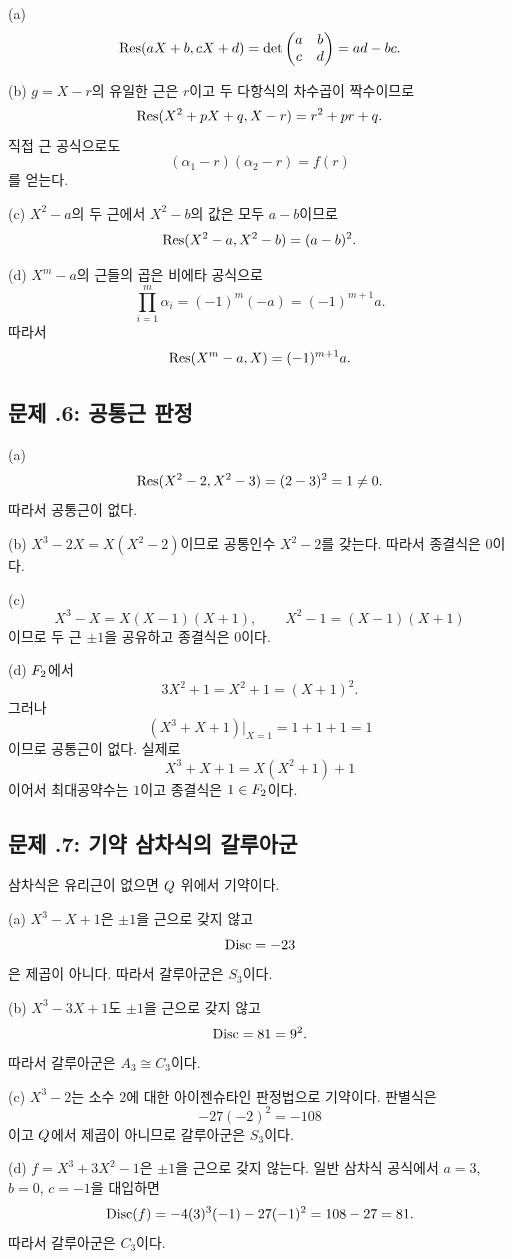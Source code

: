 \begin{solution}
(a)
\[
  \operatorname{Res}(aX+b,cX+d)
  =\det\begin{pmatrix}a&b\\c&d\end{pmatrix}
  =ad-bc.
\]

(b) $g=X-r$의 유일한 근은 $r$이고 두 다항식의 차수곱이 짝수이므로
\[
  \operatorname{Res}(X^2+pX+q,X-r)
  =r^2+pr+q.
\]
직접 근 공식으로도
\[
  (\alpha_1-r)(\alpha_2-r)=f(r)
\]
를 얻는다.

(c) $X^2-a$의 두 근에서 $X^2-b$의 값은 모두 $a-b$이므로
\[
  \operatorname{Res}(X^2-a,X^2-b)=(a-b)^2.
\]

(d) $X^m-a$의 근들의 곱은 비에타 공식으로
\[
  \prod_{i=1}^m\alpha_i=(-1)^m(-a)=(-1)^{m+1}a.
\]
따라서
\[
  \operatorname{Res}(X^m-a,X)=(-1)^{m+1}a.
\]
\end{solution}

\subsection*{문제 \thechapter.6: 공통근 판정}

\begin{solution}
(a)
\[
  \operatorname{Res}(X^2-2,X^2-3)=(2-3)^2=1\ne0.
\]
따라서 공통근이 없다.

(b) $X^3-2X=X(X^2-2)$이므로 공통인수 $X^2-2$를 갖는다. 따라서 종결식은 $0$이다.

(c)
\[
  X^3-X=X(X-1)(X+1),
  \qquad
  X^2-1=(X-1)(X+1)
\]
이므로 두 근 $\pm1$을 공유하고 종결식은 $0$이다.

(d) $F_2$에서
\[
  3X^2+1=X^2+1=(X+1)^2.
\]
그러나
\[
  (X^3+X+1)\big|_{X=1}=1+1+1=1
\]
이므로 공통근이 없다. 실제로
\[
  X^3+X+1=X(X^2+1)+1
\]
이어서 최대공약수는 $1$이고 종결식은 $1\in F_2$이다.
\end{solution}

\subsection*{문제 \thechapter.7: 기약 삼차식의 갈루아군}

\begin{solution}
삼차식은 유리근이 없으면 $Q$ 위에서 기약이다.

(a) $X^3-X+1$은 $\pm1$을 근으로 갖지 않고
\[
  \operatorname{Disc}=-23
\]
은 제곱이 아니다. 따라서 갈루아군은 $S_3$이다.

(b) $X^3-3X+1$도 $\pm1$을 근으로 갖지 않고
\[
  \operatorname{Disc}=81=9^2.
\]
따라서 갈루아군은 $A_3\cong C_3$이다.

(c) $X^3-2$는 소수 $2$에 대한 아이젠슈타인 판정법으로 기약이다. 판별식은
\[
  -27(-2)^2=-108
\]
이고 $Q$에서 제곱이 아니므로 갈루아군은 $S_3$이다.

(d) $f=X^3+3X^2-1$은 $\pm1$을 근으로 갖지 않는다. 일반 삼차식 공식에서 $a=3$, $b=0$, $c=-1$을 대입하면
\[
  \operatorname{Disc}(f)=-4(3)^3(-1)-27(-1)^2=108-27=81.
\]
따라서 갈루아군은 $C_3$이다.
\end{solution}

